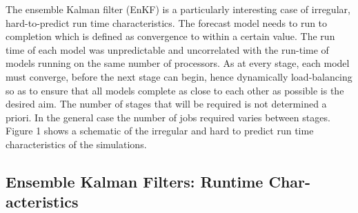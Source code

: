 \documentclass{sig-alternate}
\begin{document}
The ensemble Kalman filter (EnKF) is a particularly interesting case
of irregular, hard-to-predict run time characteristics.  The forecast
model needs to run to completion which is defined as convergence to
within a certain value.  The run time of each model was unpredictable
and uncorrelated with the run-time of models running on the same
number of processors.  As at every stage, each model must converge,
before the next stage can begin, hence dynamically load-balancing so
as to ensure that all models complete as close to each other as
possible is the desired aim.  The number of stages that will be
required is not determined a priori. In the general case the number of
jobs required varies between stages.  Figure 1 shows a schematic of
the irregular and hard to predict run time characteristics of the
simulations.

\subsection{Ensemble Kalman Filters: Runtime Char-acteristics}


\end{document}
